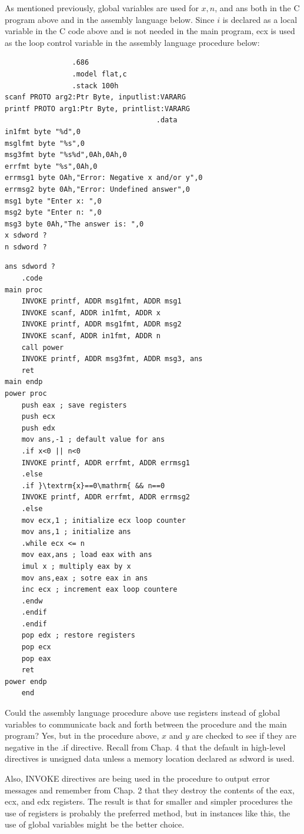 \documentclass[10pt]{book}
\begin{document}
As mentioned previously, global variables are used for $x, n$, and ans both in the C program above and in the assembly language below. Since $i$ is declared as a local variable in the C code above and is not needed in the main program, ecx is used as the loop control variable in the assembly language procedure below:

\begin{verbatim}
                .686
                .model flat,c
                .stack 100h
scanf PROTO arg2:Ptr Byte, inputlist:VARARG
printf PROTO arg1:Ptr Byte, printlist:VARARG
                                    .data
in1fmt byte "%d",0
msglfmt byte "%s",0
msg3fmt byte "%s%d",0Ah,0Ah,0
errfmt byte "%s",0Ah,0
errmsg1 byte OAh,"Error: Negative x and/or y",0
errmsg2 byte 0Ah,"Error: Undefined answer",0
msg1 byte "Enter x: ",0
msg2 byte "Enter n: ",0
msg3 byte 0Ah,"The answer is: ",0
x sdword ?
n sdword ?
\end{verbatim}

\begin{verbatim}
ans sdword ?
    .code
main proc
    INVOKE printf, ADDR msg1fmt, ADDR msg1
    INVOKE scanf, ADDR in1fmt, ADDR x
    INVOKE printf, ADDR msg1fmt, ADDR msg2
    INVOKE scanf, ADDR in1fmt, ADDR n
    call power
    INVOKE printf, ADDR msg3fmt, ADDR msg3, ans
    ret
main endp
power proc
    push eax ; save registers
    push ecx
    push edx
    mov ans,-1 ; default value for ans
    .if x<0 || n<0
    INVOKE printf, ADDR errfmt, ADDR errmsg1
    .else
    .if }\textrm{x}==0\mathrm{ && n==0
    INVOKE printf, ADDR errfmt, ADDR errmsg2
    .else
    mov ecx,1 ; initialize ecx loop counter
    mov ans,1 ; initialize ans
    .while ecx <= n
    mov eax,ans ; load eax with ans
    imul x ; multiply eax by x
    mov ans,eax ; sotre eax in ans
    inc ecx ; increment eax loop countere
    .endw
    .endif
    .endif
    pop edx ; restore registers
    pop ecx
    pop eax
    ret
power endp
    end
\end{verbatim}

Could the assembly language procedure above use registers instead of global variables to communicate back and forth between the procedure and the main program? Yes, but in the procedure above, $x$ and $y$ are checked to see if they are negative in the .if directive. Recall from Chap. 4 that the default in high-level directives is unsigned data unless a memory location declared as sdword is used.

Also, INVOKE directives are being used in the procedure to output error messages and remember from Chap. 2 that they destroy the contents of the eax, ecx, and edx registers. The result is that for smaller and simpler procedures the use of registers is probably the preferred method, but in instances like this, the use of global variables might be the better choice.
\end{document}
